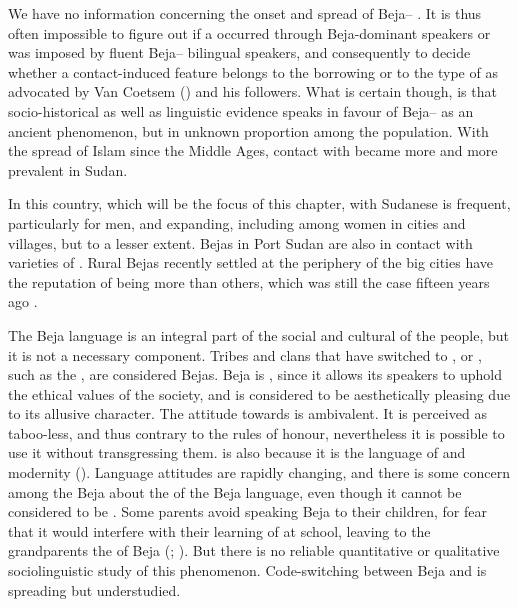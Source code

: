\documentclass[output=paper]{langsci/langscibook}
\begin{document}
We have no information concerning the onset and spread of Beja-- . It is thus often impossible to figure out if a  occurred through Beja-dominant speakers or was imposed by fluent Beja-- bilingual speakers, and consequently to decide whether a contact-induced feature belongs to the borrowing or to the  type of  as advocated by Van Coetsem (\citeyear{VanCoetsem1988,VanCoetsem2000}) and his followers. What is certain though, is that socio-historical as well as linguistic evidence speaks in favour of Beja--  as an ancient phenomenon, but in unknown proportion among the population. With the spread of Islam since the Middle Ages, contact with  became more and more prevalent in Sudan. 

In this country, which will be the focus of this chapter,  with Suda\-nese  is frequent, particularly for men, and expanding, including among women in cities and villages, but to a lesser extent. Bejas in Port Sudan are also in contact with varieties of  . Rural Bejas recently settled at the periphery of the big cities have the reputation of being more  than others, which was still the case fifteen years ago \citep{Vanhove2003}.

The Beja language is an integral part of the social and cultural  of the people, but it is not a necessary component. Tribes and clans that have switched to , or , such as the , are considered Bejas. Beja is , since it allows its speakers to uphold the ethical values of the society, and is considered to be aesthetically pleasing due to its allusive character. The attitude towards  is ambivalent. It is perceived as taboo-less, and thus contrary to the rules of honour, nevertheless it is possible to use it without transgressing them.  is also  because it is the language of  and modernity (\citealt{HamidAhmed2005article}). Language attitudes are rapidly changing, and there is some concern among the Beja  about the  of the Beja language, even though it cannot be considered to be . Some parents avoid speaking Beja to their children, for fear that it would interfere with their learning of  at school, leaving to the grandparents the  of Beja (\citealt{Wedekind2012}; \citealt{Vanhove2017}). But there is no reliable quantitative or qualitative sociolinguistic study of this phenomenon. Code-switching between Beja and  is spreading but understudied.
\end{document}
